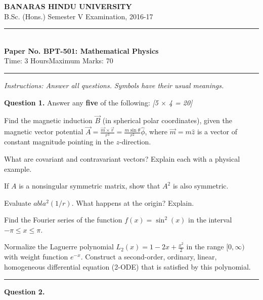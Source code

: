 \documentclass[11pt,a4paper]{article}
\newcommand{\pts}[1]{\hfill   \textit{[#1]}}
\begin{document}
\begin{center}
  {\large\bfseries BANARAS HINDU UNIVERSITY}\\[2pt]
  {\normalsize B.Sc. (Hons.) Semester V Examination, 2016-17}\\[6pt]
  \rule{0.8\linewidth}{0.5pt}\\[6pt]
  {\large\bfseries Paper No. BPT-501: Mathematical Physics}\\[4pt]
  {\normalsize Time: 3 Hours\hfill Maximum Marks: 70}
\end{center}
\rule{\linewidth}{0.4pt}
\smallskip



\noindent   \textit{Instructions: Answer all questions. Symbols have their usual meanings.}
\bigskip




\noindent   \textbf{Question 1.} Answer any   \textbf{five} of the following: \pts{5 $ \times$ 4 = 20}

\begin{parts}
  \item Find the magnetic induction $\vec{B}$ (in spherical polar coordinates), given the magnetic vector potential $\vec{A} = \frac{\vec{m}  \times \vec{r}}{r^3} = \frac{m \sin \theta}{r^2} \hat{\phi}$, where $\vec{m} = m \hat{z}$ is a vector of constant magnitude pointing in the $z$-direction.
  \item What are covariant and contravariant vectors? Explain each with a physical example.
  \item If $A$ is a nonsingular symmetric matrix, show that $A^2$ is also symmetric.
  \item Evaluate $
abla^2 (1/r)$. What happens at the origin? Explain.
  \item Find the Fourier series of the function $f(x) = \sin^2(x)$ in the interval $-\pi \le x \le \pi$.
  \item Normalize the Laguerre polynomial $L_2(x) = 1 - 2x + \frac{x^2}{2}$ in the range $[0, \infty)$ with weight function $e^{-x}$. Construct a second-order, ordinary, linear, homogeneous differential equation (2-ODE) that is satisfied by this polynomial.
\end{parts}

\medskip\rule{\linewidth}{0.2pt}




\noindent   \textbf{Question 2.}
\end{document}

